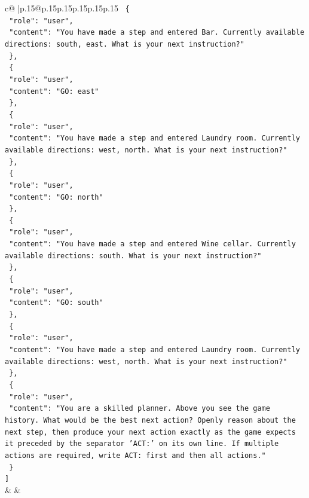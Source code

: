 \documentclass{article}
\begin{document}
{\begin{supertabular}{c@{$\;$}|p{.15\linewidth}@{}p{.15\linewidth}p{.15\linewidth}p{.15\linewidth}p{.15\linewidth}p{.15\linewidth}}
{{{\texttt{  \{} \\
\texttt{    "role": "user",} \\
\texttt{    "content": "You have made a step and entered Bar. Currently available directions: south, east. What is your next instruction?"} \\
\texttt{  \},} \\
\texttt{  \{} \\
\texttt{    "role": "user",} \\
\texttt{    "content": "GO: east"} \\
\texttt{  \},} \\
\texttt{  \{} \\
\texttt{    "role": "user",} \\
\texttt{    "content": "You have made a step and entered Laundry room. Currently available directions: west, north. What is your next instruction?"} \\
\texttt{  \},} \\
\texttt{  \{} \\
\texttt{    "role": "user",} \\
\texttt{    "content": "GO: north"} \\
\texttt{  \},} \\
\texttt{  \{} \\
\texttt{    "role": "user",} \\
\texttt{    "content": "You have made a step and entered Wine cellar. Currently available directions: south. What is your next instruction?"} \\
\texttt{  \},} \\
\texttt{  \{} \\
\texttt{    "role": "user",} \\
\texttt{    "content": "GO: south"} \\
\texttt{  \},} \\
\texttt{  \{} \\
\texttt{    "role": "user",} \\
\texttt{    "content": "You have made a step and entered Laundry room. Currently available directions: west, north. What is your next instruction?"} \\
\texttt{  \},} \\
\texttt{  \{} \\
\texttt{    "role": "user",} \\
\texttt{    "content": "You are a skilled planner. Above you see the game history. What would be the best next action? Openly reason about the next step, then produce your next action exactly as the game expects it preceded by the separator 'ACT:' on its own line. If multiple actions are required, write ACT: first and then all actions."} \\
\texttt{  \}} \\
\texttt{{]}} \\
            }
        }
    }
    & & \\ \\


\end{supertabular}}
\end{document}
